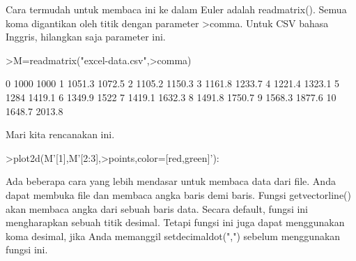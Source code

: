\documentclass[12pt,arial,letterpaper]{book}
\begin{document}
\begin{eulernootebook}
\begin{eulercomment}
\begin{eulercomment}
\begin{eulernootebook}
\begin{eulercomment}
\begin{eulercomment}
\begin{eulercomment}
\begin{eulercomment}
\begin{eulercomment}
\begin{eulercomment}
\begin{eulercomment}
\begin{eulercomment}
\begin{eulercomment}
\begin{eulercomment}
\begin{eulercomment}
\begin{eulercomment}
\begin{eulercomment}
\begin{eulercomment}
Cara termudah untuk membaca ini ke dalam Euler adalah readmatrix().
Semua koma digantikan oleh titik dengan parameter \textgreater{}comma. Untuk CSV
bahasa Inggris, hilangkan saja parameter ini.
\end{eulercomment}
\begin{eulerprompt}
>M=readmatrix("excel-data.csv",>comma)
\end{eulerprompt}
\begin{euleroutput}
          0      1000      1000 
          1    1051.3    1072.5 
          2    1105.2    1150.3 
          3    1161.8    1233.7 
          4    1221.4    1323.1 
          5      1284    1419.1 
          6    1349.9      1522 
          7    1419.1    1632.3 
          8    1491.8    1750.7 
          9    1568.3    1877.6 
         10    1648.7    2013.8 
\end{euleroutput}
\begin{eulercomment}
Mari kita rencanakan ini.
\end{eulercomment}
\begin{eulerprompt}
>plot2d(M'[1],M'[2:3],>points,color=[red,green]'):
\end{eulerprompt}
\begin{eulercomment}
Ada beberapa cara yang lebih mendasar untuk membaca data dari file.
Anda dapat membuka file dan membaca angka baris demi baris. Fungsi
getvectorline() akan membaca angka dari sebuah baris data. Secara
default, fungsi ini mengharapkan sebuah titik desimal. Tetapi fungsi
ini juga dapat menggunakan koma desimal, jika Anda memanggil
setdecimaldot(",") sebelum menggunakan fungsi ini.


\end{eulercomment}
\end{eulercomment}
\end{eulercomment}
\end{eulercomment}
\end{eulercomment}
\end{eulercomment}
\end{eulercomment}
\end{eulercomment}
\end{eulercomment}
\end{eulercomment}
\end{eulercomment}
\end{eulercomment}
\end{eulercomment}
\end{eulercomment}
\end{eulernootebook}
\end{eulercomment}
\end{eulercomment}
\end{eulernootebook}
\end{document}
